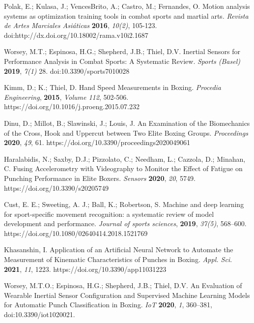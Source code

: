 \documentclass[sport,article,submit,moreauthors,pdftex]{Definitions/mdpi}
\begin{document}
\begin{thebibliography}{999}

Polak, E.; Kulasa, J.; VencesBrito, A.; Castro, M.; Fernandes, O. Motion analysis systems as optimization training tools in combat sports and martial arts. {\em Revista de Artes Marciales Asiáticas} {\bf 2016}, {\em 10(2)}, 105-123. doi:http://dx.doi.org/10.18002/rama.v10i2.1687

Worsey, M.T.; Espinosa, H.G.; Shepherd, J.B.; Thiel, D.V. Inertial Sensors for Performance Analysis in Combat Sports: A Systematic Review. {\em Sports (Basel)} {\bf 2019}, {\em 7(1)} 28. doi:10.3390/sports7010028

Kimm, D.; K.; Thiel, D. Hand Speed Measurements in Boxing. {\em Procedia Engineering}, {\bf 2015}, {\em Volume 112}, 502-506. https://doi.org/10.1016/j.proeng.2015.07.232

Dinu, D.; Millot, B.; Slawinski, J.; Louis, J. An Examination of the Biomechanics of the Cross, Hook and Uppercut between Two Elite Boxing Groups. {\em Proceedings} {\bf 2020}, {\em 49}, 61. https://doi.org/10.3390/proceedings2020049061

Haralabidis, N.; Saxby, D.J.; Pizzolato, C.; Needham, L.; Cazzola, D.; Minahan, C. Fusing Accelerometry with Videography to Monitor the Effect of Fatigue on Punching Performance in Elite Boxers. {\em Sensors} {\bf 2020}, {\em 20}, 5749. https://doi.org/10.3390/s20205749

Cust, E. E.; Sweeting, A. J.; Ball, K.; Robertson, S. Machine and deep learning for sport-specific movement recognition: a systematic review of model development and performance. {\em Journal of sports sciences}, {\bf 2019}, {\em 37(5)}, 568–600. https://doi.org/10.1080/02640414.2018.1521769

Khasanshin, I. Application of an Artificial Neural Network to Automate the Measurement of Kinematic Characteristics of Punches in Boxing. {\em Appl. Sci}. {\bf 2021}, {\em 11}, 1223. https://doi.org/10.3390/app11031223

Worsey, M.T.O.; Espinosa, H.G.; Shepherd, J.B.; Thiel, D.V. An Evaluation of Wearable Inertial Sensor Configuration and Supervised Machine Learning Models for Automatic Punch Classification in Boxing. {\em IoT} {\bf 2020}, {\em 1}, 360–381, doi:10.3390/iot1020021.

\end{thebibliography}

\end{document}

